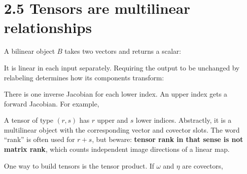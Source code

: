 \documentclass[
  11pt,
  letterpaper,
  oneside,
  openany]{scrbook}
\begin{document}
\hypertarget{tensors-are-multilinear-relationships}{%
\section{2.5 Tensors are multilinear
relationships}\label{tensors-are-multilinear-relationships}}

A bilinear object \(B\) takes two vectors and returns a scalar:

\begin{center}
\begingroup
{}
\ifdim\wd\grmathbox>\linewidth
\resizebox{\linewidth}{!}{\usebox{\grmathbox}}
\else\usebox{\grmathbox}\fi
\endgroup
\end{center}

It is linear in each input separately. Requiring the output to be
unchanged by relabeling determines how its components transform:

\begin{center}
\begingroup
{}
\ifdim\wd\grmathbox>\linewidth
\resizebox{\linewidth}{!}{\usebox{\grmathbox}}
\else\usebox{\grmathbox}\fi
\endgroup
\end{center}

There is one inverse Jacobian for each lower index. An upper index gets
a forward Jacobian. For example,

\begin{center}
\begingroup
{}
\ifdim\wd\grmathbox>\linewidth
\resizebox{\linewidth}{!}{\usebox{\grmathbox}}
\else\usebox{\grmathbox}\fi
\endgroup
\end{center}

A tensor of type \((r,s)\) has \(r\) upper and \(s\) lower indices.
Abstractly, it is a multilinear object with the corresponding vector and
covector slots. The word ``rank'' is often used for \(r+s\), but beware:
\textbf{tensor rank in that sense is not matrix rank}, which counts
independent image directions of a linear map.

One way to build tensors is the tensor product. If \(\omega\) and
\(\eta\) are covectors,

\begin{center}
\begingroup
{}
\ifdim\wd\grmathbox>\linewidth
\resizebox{\linewidth}{!}{\usebox{\grmathbox}}
\else\usebox{\grmathbox}\fi
\endgroup
\end{center}
\end{document}
